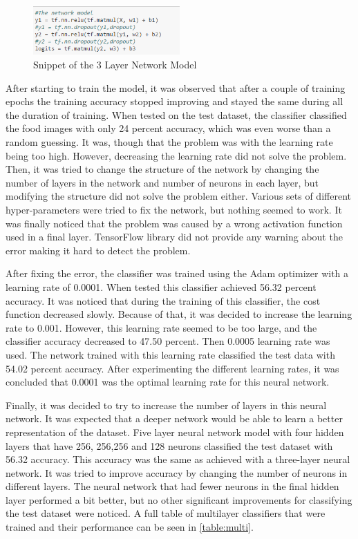 \begin{figure}[h]
\centering
\includegraphics[width=0.5\textwidth]{Figures/3layer.PNG}
\caption{Snippet of the 3 Layer Network Model}
\label{fig:3lay}
\end{figure}


After starting to train the model, it was observed that after a couple of training epochs the training accuracy stopped improving and stayed the same during all the duration of training. When tested on the test dataset, the classifier classified the food images with only 24 percent accuracy, which was even worse than a random guessing. It was, though that the problem was with the learning rate being too high. However, decreasing the learning rate did not solve the problem. Then, it was tried to change the structure of the network by changing the number of layers in the network and number of neurons in each layer, but modifying the structure did not solve the problem either. Various sets of different hyper-parameters were tried to fix the network, but nothing seemed to work. It was finally noticed that the problem was caused by a wrong activation function used in a final layer. TensorFlow library did not provide any warning about the error making it hard to detect the problem. 

After fixing the error, the classifier was trained using the Adam optimizer with a learning rate of 0.0001. When tested this classifier achieved 56.32 percent accuracy. It was noticed that during the training of this classifier, the cost function decreased slowly. Because of that, it was decided to increase the learning rate to 0.001. However, this learning rate seemed to be too large, and the classifier accuracy decreased to 47.50 percent. Then 0.0005 learning rate was used. The network trained with this learning rate classified the test data with 54.02 percent accuracy. After experimenting the different learning rates, it was concluded that  0.0001 was the optimal learning rate for this neural network.

Finally, it was decided to try to increase the number of layers in this neural network. It was expected that a deeper network would be able to learn a better representation of the dataset. Five layer neural network model with four hidden layers that have 256, 256,256 and 128 neurons classified the test dataset with 56.32 accuracy. This accuracy was the same as achieved with a three-layer neural network. It was tried to improve accuracy by changing the number of neurons in different layers. The neural network that had fewer neurons in the final hidden layer performed a bit better, but no other significant improvements for classifying the test dataset were noticed. A full table of multilayer classifiers that were trained and their performance can be seen in \autoref{table:multi}.

